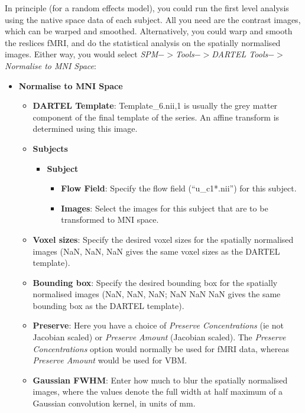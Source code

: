 In principle (for a random effects model), you could run the first level analysis using the native space data of each subject.
All you need are the contrast images, which can be warped and smoothed.
Alternatively, you could warp and smooth the reslices fMRI, and do the statistical analysis on the spatially normalised images.
Either way, you would select \emph{SPM$->$Tools$->$DARTEL Tools$->$Normalise to MNI Space}:
\begin{itemize}
\item{{\bf Normalise to MNI Space}
    \begin{itemize}
    \item{{\bf DARTEL Template}: Template\_6.nii,1 is usually the grey matter component of the final template of the series.  An affine transform is determined using this image.}
    \item{{\bf Subjects}
        \begin{itemize}
        \item{{\bf Subject}
            \begin{itemize}
            \item{{\bf Flow Field}: Specify the flow field (``u\_c1*.nii'') for this subject.}
            \item{{\bf Images}: Select the images for this subject that are to be transformed to MNI space.}
            \end{itemize}
        }
        \end{itemize}
    }
    \item{{\bf Voxel sizes}: Specify the desired voxel sizes for the spatially normalised images (NaN, NaN, NaN gives the same voxel sizes as the DARTEL template).}
    \item{{\bf Bounding box}: Specify the desired bounding box for the spatially normalised images (NaN, NaN, NaN; NaN NaN NaN gives the same bounding box as the DARTEL template).}
    \item{{\bf Preserve}: Here you have a choice of \emph{Preserve Concentrations} (ie not Jacobian scaled) or \emph{Preserve Amount} (Jacobian scaled).  The \emph{Preserve Concentrations} option would normally be used for fMRI data, whereas \emph{Preserve Amount} would be used for VBM.}
    \item{{\bf Gaussian FWHM}: Enter how much to blur the spatially normalised images, where the values denote the full width at half maximum of a Gaussian convolution kernel, in units of mm.}
    \end{itemize}
}
\end{itemize}

